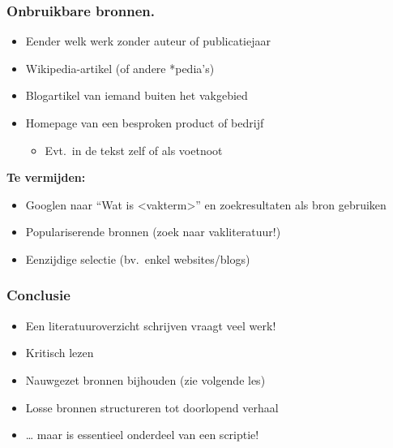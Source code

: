\documentclass[aspectratio=169]{beamer}
\begin{document}
\begin{frame}
  \frametitle{Onbruikbare bronnen.}

  \begin{itemize}
    \item Eender welk werk zonder auteur of publicatiejaar
    \item Wikipedia-artikel (of andere *pedia's)
    \item Blogartikel van iemand buiten het vakgebied
    \item Homepage van een besproken product of bedrijf
          \begin{itemize}
            \item Evt.~in de tekst zelf of als voetnoot
          \end{itemize}
  \end{itemize}

  \textbf{Te vermijden:}

  \begin{itemize}
    \item Googlen naar ``Wat is <vakterm>'' en zoekresultaten als bron gebruiken
    \item Populariserende bronnen (zoek naar vakliteratuur!)
    \item Eenzijdige selectie (bv.~enkel websites/blogs)
  \end{itemize}
\end{frame}

\begin{frame}
  \frametitle{Conclusie}

  \begin{itemize}
    \item Een literatuuroverzicht schrijven vraagt veel werk!
    \item Kritisch lezen
    \item Nauwgezet bronnen bijhouden (zie volgende les)
    \item Losse bronnen structureren tot doorlopend verhaal
    \item \ldots{} maar is essentieel onderdeel van een scriptie!
  \end{itemize}

\end{frame}
\end{document}
